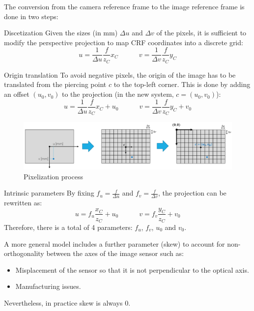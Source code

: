 The conversion from the camera reference frame to the image reference frame
is done in two steps:
\begin{descriptionlist}
    \item[Discetization] 
        Given the sizes (in mm) $\Delta u$ and $\Delta v$ of the pixels,
        it is sufficient to modify the perspective projection to map CRF coordinates into a discrete grid:
        \[ 
            u = \frac{1}{\Delta u}\frac{f}{z_C}x_C 
            \hspace{3em} 
            v = \frac{1}{\Delta v}\frac{f}{z_C}y_C 
        \]

    \item[Origin translation] 
        To avoid negative pixels, the origin of the image has to be translated from the piercing point $c$ to the top-left corner.
        This is done by adding an offset $(u_0, v_0)$ to the projection (in the new system, $c = (u_0, v_0)$):
        \[ 
            u = \frac{1}{\Delta u}\frac{f}{z_C}x_C + u_0
            \hspace{3em} 
            v = \frac{1}{\Delta v}\frac{f}{z_C}y_C +v_0
        \]

    \begin{figure}[H]
        \centering
        \includegraphics[width=0.9\linewidth]{./img/_pixelization.pdf}
        \caption{Pixelization process}
    \end{figure}

    \item[Intrinsic parameters] 
        By fixing $f_u = \frac{f}{\Delta u}$ and $f_v = \frac{f}{\Delta v}$, the projection can be rewritten as:
        \[ 
            u = f_u\frac{x_C}{z_C} + u_0
            \hspace{3em} 
            v = f_v\frac{y_C}{z_C} +v_0
        \]
        Therefore, there is a total of 4 parameters: $f_u$, $f_v$, $u_0$ and $v_0$.
        
        \begin{remark}
            A more general model includes a further parameter (skew)
            to account for non-orthogonality between the axes of the image sensor such as:
            \begin{itemize}
                \item Misplacement of the sensor so that it is not perpendicular to the optical axis.
                \item Manufacturing issues.
            \end{itemize}

            Nevertheless, in practice skew is always 0.
        \end{remark}
\end{descriptionlist}


